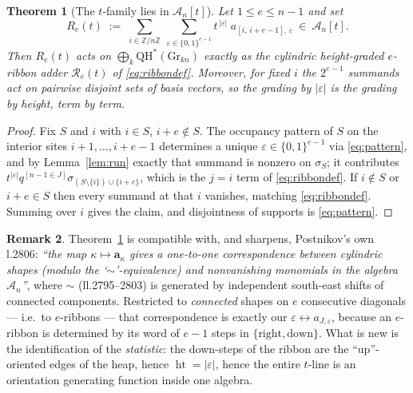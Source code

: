 \documentclass[11pt]{article}
\theoremstyle{plain}
\newtheorem{theorem}{Theorem}
\theoremstyle{definition}
\newtheorem{remark}[theorem]{Remark}
\newcommand{\A}{\mathscr{A}}
\newcommand{\QH}{\mathrm{QH}^*}
\newcommand{\Gr}{\mathrm{Gr}}
\newcommand{\ZZ}{\mathbb{Z}}
\DeclareMathOperator{\hgt}{ht}
\begin{document}
\begin{theorem}[{The $t$-family lies in $\A_n[t]$}]\label{thm:A}
Let $1\le e\le n-1$ and set
\begin{equation}\label{eq:Rdef}
\boxed{\;
R_e(t)\;:=\;\sum_{i\in\ZZ/n\ZZ}\ \sum_{\varepsilon\in\{0,1\}^{e-1}}
t^{\,|\varepsilon|}\; a_{[i,\,i+e-1],\,\varepsilon}\ \in\ \A_n[t].\;}
\end{equation}
Then $R_e(t)$ acts on $\bigoplus_k\QH(\Gr_{kn})$ exactly as the cylindric
height-graded $e$-ribbon adder $\mathcal R_e(t)$ of
\eqref{eq:ribbondef}.  Moreover, for fixed $i$ the $2^{e-1}$ summands act
on pairwise disjoint sets of basis vectors, so the grading by
$|\varepsilon|$ is the grading by height, term by term.
\end{theorem}

\begin{proof}
Fix $S$ and $i$ with $i\in S$, $i+e\notin S$.  The occupancy pattern of
$S$ on the interior sites $i+1,\dots,i+e-1$ determines a unique
$\varepsilon\in\{0,1\}^{e-1}$ via \eqref{eq:pattern}, and by
Lemma~\ref{lem:run} exactly that summand is nonzero on $\sigma_S$; it
contributes $t^{|\varepsilon|}q^{[n-1\in J]}\sigma_{(S\setminus\{i\})\cup\{i+e\}}$,
which is the $j=i$ term of \eqref{eq:ribbondef}.  If $i\notin S$ or
$i+e\in S$ then every summand at that $i$ vanishes, matching
\eqref{eq:ribbondef}.  Summing over $i$ gives the claim, and disjointness
of supports is \eqref{eq:pattern}.
\end{proof}

\begin{remark}
Theorem~\ref{thm:A} is compatible with, and sharpens, Postnikov's own
l.2806: \emph{``the map $\kappa\mapsto\mathbf a_\kappa$ gives a
one-to-one correspondence between cylindric shapes (modulo the
`$\sim$'-equivalence) and nonvanishing monomials in the algebra
$\A_n$''}, where $\sim$ (ll.2795--2803) is generated by independent
south-east shifts of connected components.  Restricted to
\emph{connected} shapes on $e$ consecutive diagonals --- i.e.\ to
$e$-ribbons --- that correspondence is exactly our
$\varepsilon\leftrightarrow a_{J,\varepsilon}$, because an $e$-ribbon is
determined by its word of $e-1$ steps in $\{\text{right},\text{down}\}$.
What is new is the identification of the \emph{statistic}: the down-steps
of the ribbon are the ``up''-oriented edges of the heap, hence
$\hgt=|\varepsilon|$, hence the entire $t$-line is an orientation
generating function inside one algebra.
\end{remark}
\end{document}
